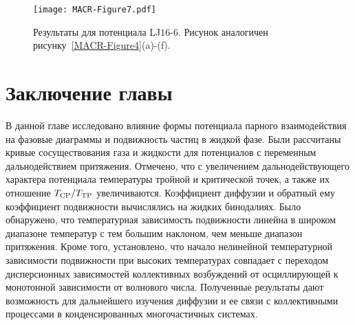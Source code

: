 \begin{figure}[!t]
\centering
    \texttt{[image: MACR-Figure7.pdf]}
    \caption{Результаты для потенциала LJ$16$-$6$.
    Рисунок аналогичен рисунку~\ref{MACR-Figure4}(a)-(f).}
\label{MACR-Figure7}
\end{figure}


\section{Заключение главы}
\label{MACR-SecConclusions}

В данной главе исследовано влияние формы потенциала парного взаимодействия на фазовые диаграммы и подвижность частиц в жидкой фазе.
Были рассчитаны кривые сосуществования газа и жидкости для потенциалов с переменным дальнодействием притяжения.
Отмечено, что с увеличением дальнодействующего характера потенциала температуры тройной и критической точек, а также их отношение $T_{\rm CP}/T_{\rm TP}$ увеличиваются.
Коэффициент диффузии и обратный ему коэффициент подвижности вычислялись на жидких бинодалиях.
Было обнаружено, что температурная зависимость подвижности линейна в широком диапазоне температур с тем большим наклоном, чем меньше диапазон притяжения.
Кроме того, установлено, что начало нелинейной температурной зависимости подвижности при высоких температурах совпадает с переходом дисперсионных зависимостей коллективных возбуждений от осциллирующей к монотонной зависимости от волнового числа.
Полученные результаты дают возможность для дальнейшего изучения диффузии и ее связи с коллективными процессами в конденсированных многочастичных системах.
